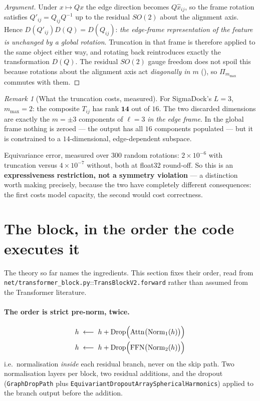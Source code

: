 \documentclass[11pt,a4paper]{report}
\theoremstyle{definition}
\theoremstyle{remark}
\newtheorem{remark}[remark]{Remark}
\newcommand{\file}[1]{\texttt{#1}}
\newcommand{\pyfunc}[1]{\texttt{#1}}
\begin{document}
\begin{proof}[Argument]
Under $x\mapsto Qx$ the edge direction becomes $Q\hat x_{ij}$, so the frame
rotation satisfies $Q'_{ij}=Q_{ij}Q^{-1}$ up to the residual $SO(2)$ about
the alignment axis. Hence $D(Q'_{ij})D(Q)=D(Q_{ij})$: \emph{the edge-frame
representation of the feature is unchanged by a global rotation}. Truncation
in that frame is therefore applied to the same object either way, and
rotating back reintroduces exactly the transformation $D(Q)$. The residual
$SO(2)$ gauge freedom does not spoil this because rotations about the
alignment axis act \emph{diagonally in $m$}
(), so $\Pi_{m_{\max}}$ commutes with them.
\end{proof}

\begin{remark}[What the truncation costs, measured]
\label{rem:mmax-measured}
For SigmaDock's $L=3$, $m_{\max}=2$: the composite $T_{ij}$ has rank
$\mathbf{14}$ out of $16$. The two discarded dimensions are exactly the
$m=\pm3$ components of $\ell=3$ \emph{in the edge frame}. In the global frame
nothing is zeroed --- the output has all $16$ components populated --- but it
is constrained to a $14$-dimensional, edge-dependent subspace.

Equivariance error, measured over $300$ random rotations: $2\times10^{-6}$
with truncation versus $4\times10^{-7}$ without, both at float32 round-off.
So this is an \textbf{expressiveness restriction, not a symmetry violation}
--- a distinction worth making precisely, because the two have completely
different consequences: the first costs model capacity, the second would cost
correctness.
\end{remark}

\section{The block, in the order the code executes it}
\label{sec:v2-block-order}

The theory so far names the ingredients. This section fixes their order,
read from \file{net/transformer\_block.py}::\pyfunc{TransBlockV2.forward}
rather than assumed from the Transformer literature.

\paragraph{The order is strict pre-norm, twice.}
\begin{equation}
\label{eq:v2-block-order}
\begin{aligned}
h &\;\longleftarrow\; h + \mathrm{Drop}\Bigl(\mathrm{Attn}\bigl(\mathrm{Norm}_1(h)\bigr)\Bigr) \\
h &\;\longleftarrow\; h + \mathrm{Drop}\Bigl(\mathrm{FFN}\bigl(\mathrm{Norm}_2(h)\bigr)\Bigr)
\end{aligned}
\end{equation}
i.e.\ normalisation \emph{inside} each residual branch, never on the skip
path. Two normalisation layers per block, two residual additions, and the
dropout (\pyfunc{GraphDropPath} plus \pyfunc{EquivariantDropoutArraySphericalHarmonics})
applied to the branch output before the addition.
\end{document}
